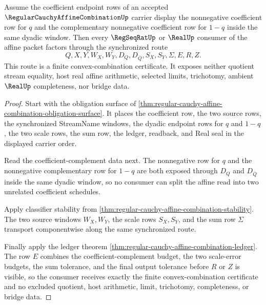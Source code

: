 \begin{theorem}
\label{thm:regular-cauchy-affine-combination-convex-route}
Assume the coefficient endpoint rows of an accepted $\RegularCauchyAffineCombinationUp$ carrier display the nonnegative coefficient row for $q$ and the complementary nonnegative coefficient row for $1-q$ inside the same dyadic window. Then every $\RegSeqRatUp$ or $\RealUp$ consumer of the affine packet factors through the synchronized route
$$
Q,X,Y,W_X,W_Y,D_Q,D_{\bar Q},S_X,S_Y,\Sigma,E,R,Z .
$$
This route is a finite convex-combination certificate. It exposes neither quotient stream equality, host real affine arithmetic, selected limits, trichotomy, ambient $\RealUp$ completeness, nor bridge data.
\end{theorem}
\begin{proof}
Start with the obligation surface of \autoref{thm:regular-cauchy-affine-combination-obligation-surface}. It places the coefficient row, the two source rows, the synchronized StreamName windows, the dyadic endpoint rows for $q$ and $1-q$, the two scale rows, the sum row, the ledger, readback, and Real seal in the displayed carrier order.

Read the coefficient-complement data next. The nonnegative row for $q$ and the nonnegative complementary row for $1-q$ are both exposed through $D_Q$ and $D_{\bar Q}$ inside the same dyadic window, so no consumer can split the affine read into two unrelated coefficient schedules.

Apply classifier stability from \autoref{thm:regular-cauchy-affine-combination-stability}. The two source windows $W_X,W_Y$, the scale rows $S_X,S_Y$, and the sum row $\Sigma$ transport componentwise along the same synchronized route.

Finally apply the ledger theorem \autoref{thm:regular-cauchy-affine-combination-ledger}. The row $E$ combines the coefficient-complement budget, the two scale-error budgets, the sum tolerance, and the final output tolerance before $R$ or $Z$ is visible, so the consumer receives exactly the finite convex-combination certificate and no excluded quotient, host arithmetic, limit, trichotomy, completeness, or bridge data.
\end{proof}

